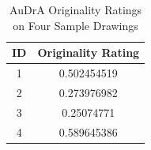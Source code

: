 \documentclass[../Proposal_Writing_Sample.tex]{subfiles}
\begin{document}
\begin{table}[htbp]
    \centering
    \begin{tabular}{c c} 
        \hline
        ID & Originality Rating \\ 
        \hline
        1 & 0.502454519 \\ 
        2 & 0.273976982 \\
        3 & 0.25074771 \\
        4 & 0.589645386 \\
        \hline
    \end{tabular}
    \caption{AuDrA Originality Ratings on Four Sample Drawings}
    \label{tab: audra_sample_rating}
\end{table}

\end{document}
